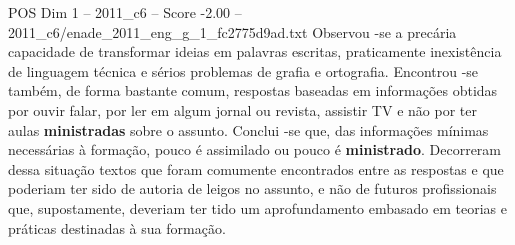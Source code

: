 \begin{textsample}{POS Dim 1 – 2011\_c6 – Score -2.00 – 2011\_c6/enade\_2011\_eng\_g\_1\_fc2775d9ad.txt}
Observou -se a precária capacidade de transformar ideias em palavras escritas, praticamente inexistência de linguagem técnica e sérios problemas de grafia e ortografia.
Encontrou -se também, de forma bastante comum, respostas baseadas em informações obtidas por ouvir falar, por ler em algum jornal ou revista, assistir TV e não por ter aulas \textbf{ministradas} sobre o assunto.
Conclui -se que, das informações mínimas necessárias à formação, pouco é assimilado ou pouco é \textbf{ministrado}.
Decorreram dessa situação textos que foram comumente encontrados entre as respostas e que poderiam ter sido de autoria de leigos no assunto, e não de futuros profissionais que, supostamente, deveriam ter tido um aprofundamento embasado em teorias e práticas destinadas à sua formação.

\end{textsample}
